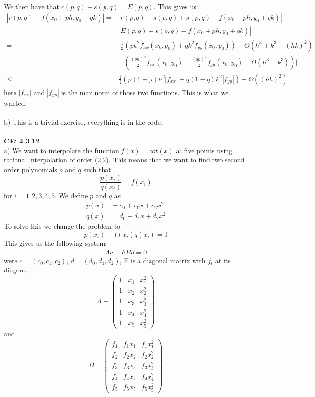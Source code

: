 \documentclass[11pt,a4paper]{report}
\begin{document}
We then have that $r(p,q)-s(p,q)=E(p,q)$. This gives us:
\begin{align*}
|r(p,q)-f(x_0+ph,y_0+qk)| = &|r(p,q)-s(p,q)+s(p,q)-f(x_0+ph,y_0+qk)| \\
=&|E(p,q)+s(p,q)-f(x_0+ph,y_0+qk)| \\
=&|\frac{1}{2}(ph^2f_{xx}(x_0,y_0)+qk^2f_{yy}(x_0,y_0)) +O(h^3+k^3+(hk)^2)\\
&-(\frac{(ph)^2}{2}f_{xx}(x_0,y_0)+\frac{(qk)^2}{2}f_{yy}(x_0,y_0) +O(h^3+k^3))| \\
\leq &\frac{1}{2}(p(1-p)h^2|f_{xx}|+q(1-q)k^2|f_{yy}|)+ O((hk)^2)
\end{align*}
here $|f_{xx}|$ and $|f_{yy}|$ is the max norm of those two functions. This is what we wanted.
\\
\\
b) This is a trivial exercise, everything is in the code.
\\
\\
\textbf{CE: 4.3.12}
\\
a) We want to interpolate the function $f(x)=cot(x)$ at five points using rational interpolation of order (2,2). This means that we want to find two second order polynomials $p$ and $q$ such that $$\frac{p(x_i)}{q(x_i)}=f(x_i) $$ for $i=1,2,3,4,5$. We define $p$ and $q$ as: 
\begin{align*}
p(x) &= c_0+c_1x+c_2x^2 \\
q(x) &= d_0+d_1x+d_2x^2
\end{align*} 
To solve this we change the problem to $$p(x_i)-f(x_i)q(x_i)=0$$ This gives us the following system: 
\begin{align*}
Ac-FBd=0
\end{align*}
were $c=(c_0,c_1,c_2)$,  $d=(d_0,d_1,d_2)$, F is a diagonal matrix with $f_i$ at its diagonal,
$$ 
A = 
 \begin{pmatrix}
  1 & x_1 & x_1^2  \\
  1 & x_2 & x_2^2  \\
  1 & x_3 & x_3^2   \\
  1 & x_4 & x_4^2 \\
  1 & x_5 & x_5^2
 \end{pmatrix}
$$
and 
$$ 
B = 
 \begin{pmatrix}
  f_1 & f_1x_1 & f_1x_1^2  \\
  f_2 & f_2x_2 & f_2x_2^2  \\
  f_3 & f_3x_3 & f_3x_3^2   \\
  f_4 & f_4x_4 & f_4x_4^2 \\
  f_5 & f_5x_5 & f_5x_5^2
 \end{pmatrix}
$$
\end{document}
